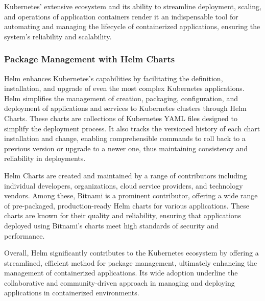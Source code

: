 \documentclass{report}
\begin{document}
    Kubernetes' extensive ecosystem and its ability to streamline deployment, scaling, and operations of application containers render it an indispensable tool for automating and managing the lifecycle of containerized applications, ensuring the system's reliability and scalability.

    \subsubsection{Package Management with Helm Charts}
    Helm enhances Kubernetes's capabilities by facilitating the definition, installation, and upgrade of even the most complex Kubernetes applications. Helm simplifies the management of creation, packaging, configuration, and deployment of applications and services to Kubernetes clusters through Helm Charts. These charts are collections of Kubernetes YAML files designed to simplify the deployment process. It also tracks the versioned history of each chart installation and change, enabling comprehensible commands to roll back to a previous version or upgrade to a newer one, thus maintaining consistency and reliability in deployments.

    Helm Charts are created and maintained by a range of contributors including individual developers, organizations, cloud service providers, and technology vendors. Among these, Bitnami is a prominent contributor, offering a wide range of pre-packaged, production-ready Helm charts for various applications. These charts are known for their quality and reliability, ensuring that applications deployed using Bitnami's charts meet high standards of security and performance.

    Overall, Helm significantly contributes to the Kubernetes ecosystem by offering a streamlined, efficient method for package management, ultimately enhancing the management of containerized applications. Its wide adoption underline the collaborative and community-driven approach in managing and deploying applications in containerized environments.
\end{document}
